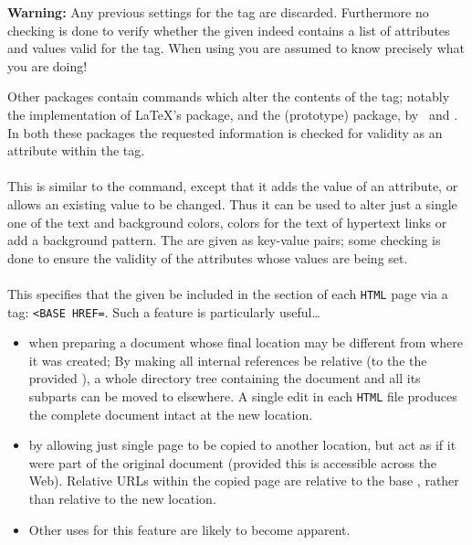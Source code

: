 \medskip
{}\html{\\}%
\noindent
\textbf{Warning: }Any previous settings for the  tag
are discarded. Furthermore no checking is done to verify whether the given 
indeed contains a list of attributes and values valid for the  tag.\html{\\}
When using  you are assumed to know precisely what you are doing!

\medskip\noindent
Other packages contain commands which alter the contents of the  tag;
notably the  implementation of \LaTeX's  package,
and the (prototype)  package, by \Wilck\ and \RossMoore.
In both these packages the requested information is checked for
validity as an attribute within the  tag.

%
\paragraph*{\texttt{}\label{htmlbody}}
This is similar to the  command, except that it adds the
value of an attribute, or allows an existing value to be changed.
Thus it can be used to alter just a single one of the text and background colors, 
colors for the text of hypertext links or add a background pattern.
The  are given as key-value pairs; some checking is done to ensure 
the validity of the attributes whose values are being set.%

%
\paragraph*{\texttt{}\label{htmlbase}}
This specifies that the given  be included in the  section
of each \texttt{HTML} page via a tag: 
\texttt{<BASE HREF=}.\html{\\}
Such a feature is particularly useful\dots 
\begin{itemize}
\item
when preparing a document whose final location may be different from where it was created; 
By making all internal references be relative (to the the provided ),
a whole directory tree containing the document 
and all its subparts can be moved to elsewhere.
A single edit in each \texttt{HTML} file produces the complete document intact 
at the new location.
%
\item
by allowing just single page to be copied to another location, but act as if it were
part of the original document (provided this is accessible across the Web).
Relative URLs within the copied page are relative to the base ,
rather than relative to the new location.
%
\item
Other uses for this feature are likely to become apparent.%
\end{itemize}


